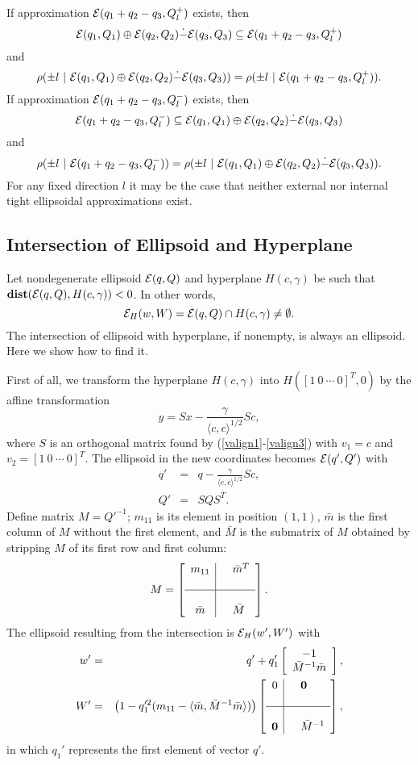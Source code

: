 If approximation $\EE(q_1+q_2-q_3,Q_l^+)$ exists, then
\[ \EE(q_1,Q_1)\oplus\EE(q_2,Q_2)\dot{-}\EE(q_3,Q_3) \subseteq
\EE(q_1+q_2-q_3,Q_l^+) \]
and
\[ \rho(\pm l ~|~ \EE(q_1,Q_1)\oplus\EE(q_2,Q_2)\dot{-}\EE(q_3,Q_3)) =
\rho(\pm l ~|~ \EE(q_1+q_2-q_3,Q_l^+)). \]
If approximation $\EE(q_1+q_2-q_3,Q_l^-)$ exists, then
\[ \EE(q_1+q_2-q_3,Q_l^-) \subseteq
\EE(q_1,Q_1)\oplus\EE(q_2,Q_2)\dot{-}\EE(q_3,Q_3) \]
and
\[ \rho(\pm l ~|~\EE(q_1+q_2-q_3,Q_l^-)) =
\rho(\pm l ~|~ \EE(q_1,Q_1)\oplus\EE(q_2,Q_2)\dot{-}\EE(q_3,Q_3)) . \]
For any fixed direction $l$ it may be the case that neither external nor
internal tight ellipsoidal approximations exist.


\subsection{Intersection of Ellipsoid and Hyperplane}
Let nondegenerate ellipsoid $\EE(q,Q)$ and hyperplane $H(c,\gamma)$ be such that
${\bf dist}(\EE(q,Q),H(c,\gamma))<0$. In other words,
\[ \EE_H(w,W) = \EE(q,Q)\cap H(c,\gamma) \neq \emptyset .\]
The intersection of ellipsoid with hyperplane, if nonempty, is always an
ellipsoid. Here we show how to find it.

First of all, we transform the hyperplane $H(c,\gamma)$
into $H([1~0~\cdots~0]^T, 0)$ by the affine transformation
\[ y = Sx - \frac{\gamma}{\langle c,c\rangle^{1/2}}Sc, \]
where $S$ is an orthogonal matrix found by (\ref{valign1}-\ref{valign3}) with
$v_1=c$ and $v_2=[1~0~\cdots~0]^T$.
The ellipsoid in the new coordinates becomes $\EE(q',Q')$ with
\begin{eqnarray*}
q' & = & q-\frac{\gamma}{\langle c,c\rangle^{1/2}}Sc, \\
Q' & = & SQS^T.
\end{eqnarray*}
Define matrix $M=Q'^{-1}$; $m_{11}$ is its element in position $(1,1)$,
$\bar{m}$ is the first column of  $M$ without the first element,
and $\bar{M}$ is the submatrix of $M$ obtained by stripping $M$ of its
first row and first column:
\[ M = \left[\begin{array}{c|cl}
m_{11} & & \bar{m}^T\\
 & \\
\hline
 & \\
\bar{m} & & \bar{M}\end{array}\right]. \]
The ellipsoid resulting from the intersection is $\EE_H(w',W')$ with
\begin{eqnarray*}
w' & = & q' + q_1'\left[\begin{array}{c}
-1\\
\bar{M}^{-1}\bar{m}\end{array}\right],\\
W' & = & \left(1-q_1'^2(m_{11}-
\langle\bar{m},\bar{M}^{-1}\bar{m}\rangle)\right)\left[\begin{array}{c|cl}
0 & & {\bf 0}\\
 & \\
\hline
 & \\
{\bf 0} & & \bar{M}^{-1}\end{array}\right],
\end{eqnarray*}
in which $q_1'$ represents the first element of vector $q'$.


